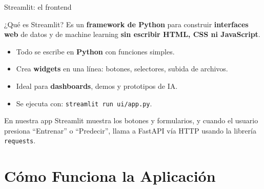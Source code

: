 \documentclass[10pt,aspectratio=169]{beamer}
\begin{document}
\begin{frame}{Streamlit: el frontend}
  \begin{block}{¿Qué es Streamlit?}
    Es un \textbf{framework de Python} para construir \textbf{interfaces web}
    de datos y de machine learning \textbf{sin escribir HTML, CSS ni JavaScript}.
  \end{block}

  \pause

  \begin{itemize}
    \item Todo se escribe en \textbf{Python} con funciones simples.
    \item Crea \textbf{widgets} en una línea: botones, selectores, subida de archivos.
    \item Ideal para \textbf{dashboards}, demos y prototipos de IA.
    \item Se ejecuta con: \texttt{streamlit run ui/app.py}.
  \end{itemize}

  \pause
  \begin{exampleblock}{En nuestra app}
    Streamlit muestra los botones y formularios, y cuando el usuario presiona
    ``Entrenar'' o ``Predecir'', llama a FastAPI vía HTTP usando la librería
    \texttt{requests}.
  \end{exampleblock}
\end{frame}

\section{Cómo Funciona la Aplicación}
\end{document}
